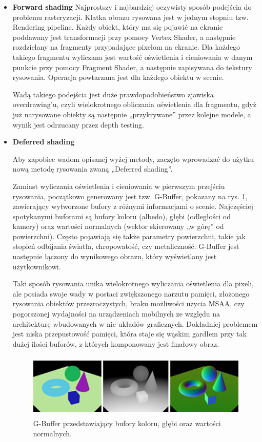\begin{itemize}
	\item \textbf{Forward shading}
	Najprostszy i najbardziej oczywisty sposób podejścia do problemu rasteryzacji. Klatka obrazu rysowana jest w jednym stopniu tzw. Rendering pipeline. Każdy obiekt, który ma się pojawić na ekranie poddawany jest transformacji przy pomocy Vertex Shader, a następnie rozdzielany na fragmenty przypadające pixelom na ekranie. Dla każdego takiego fragmentu wyliczana jest wartość oświetlenia i cieniowania w danym punkcie przy pomocy Fragment Shader, a następnie zapisywana do tekstury rysowania. Operacja powtarzana jest dla każdego obiektu w scenie.
	
	Wadą takiego podejścia jest duże prawdopodobieństwo zjawiska overdrawing'u, czyli wielokrotnego obliczania oświetlenia dla fragmentu, gdyż już narysowane obiekty są następnie „przykrywane'' przez kolejne modele, a wynik jest odrzucany przez depth testing.
	
	\item \textbf{Deferred shading}
	
	Aby zapobiec wadom opisanej wyżej metody, zaczęto wprowadzać do użytku nową metodę rysowania zwaną „Deferred shading''.
	
	Zamiast wyliczania oświetlenia i cieniowania w pierwszym przejściu rysowania, początkowo generowany jest tzw. G-Buffer, pokazany na rys. \ref{intro-deferred-shading}, zawierający wytworzone bufory z różnymi informacjami o scenie. Najczęściej spotykanymi buforami są bufory koloru (albedo), głębi (odległości od kamery) oraz wartości normalnych (wektor skierowany „w górę'' od powierzchni). Często pojawiają się także parametry powierzchni, takie jak stopień odbijania światła, chropowatość, czy metaliczność. G-Buffer jest następnie łączony do wynikowego obrazu, który wyświetlany jest użytkownikowi.
	
	Taki sposób rysowania unika wielokrotnego wyliczania oświetlenia dla pixeli, ale posiada swoje wady w postaci zwiększonego narzutu pamięci, złożonego rysowania obiektów przezroczystych, braku możliwości użycia MSAA, czy pogorszonej wydajności na urządzeniach mobilnych ze względu na architekturę wbudowanych w nie układów graficznych. Dokładniej problemem jest niska przepustowość pamięci, która staje się wąskim gardłem przy tak dużej ilości buforów, z których komponowany jest finałowy obraz.
	
	\begin{figure}[htbp]
		\centering
		\includegraphics[width=4.85833in,height=1.21782in]{images/1_g_buffer.png}
		\caption{G-Buffer przedstawiający bufory koloru, głębi oraz wartości normalnych. \cite{tutsplus-deferred-2024}}
		\label{intro-deferred-shading}
	\end{figure}
	

\end{itemize}
